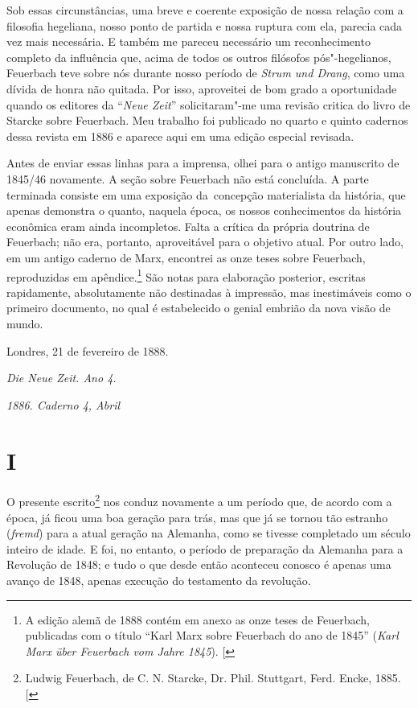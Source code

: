 Sob essas circunstâncias, uma breve e coerente exposição de nossa
relação com a filosofia hegeliana, nosso ponto de partida e nossa
ruptura com ela, parecia cada vez mais necessária. E também me pareceu
necessário um reconhecimento completo da influência que, acima de todos
os outros filósofos pós"-hegelianos, Feuerbach teve sobre nós durante
nosso período de \emph{Strum und Drang}, como uma dívida de honra não
quitada. Por isso, aproveitei de bom grado a oportunidade quando os
editores da ``\emph{Neue Zeit}'' solicitaram"-me uma revisão critica do
livro de Starcke sobre Feuerbach. Meu trabalho foi publicado no quarto e
quinto cadernos dessa revista em 1886 e aparece aqui em uma edição
especial revisada.

Antes de enviar essas linhas para a imprensa, olhei para o antigo
manuscrito de 1845/46 novamente. A seção sobre Feuerbach não está
concluída. A parte terminada consiste em uma exposição da\est\ concepção
materialista da história, que apenas demonstra o quanto, naquela época,
os nossos conhecimentos da história econômica eram ainda incompletos.
Falta a crítica da própria doutrina de Feuerbach; não era, portanto,
aproveitável para o objetivo atual. Por outro lado, em um antigo caderno
de Marx, encontrei as onze teses sobre Feuerbach, reproduzidas em
apêndice.\footnote{A edição alemã de 1888 contém em anexo as
  onze teses de Feuerbach, publicadas com o título ``Karl Marx sobre
  Feuerbach do ano de 1845'' (\emph{Karl Marx über Feuerbach vom Jahre
  1845}). {[}\versal{N.\,T.}{]}} São notas para elaboração posterior, escritas rapidamente,
absolutamente não destinadas à impressão, mas inestimáveis ​​como o
primeiro documento, no qual é estabelecido o genial embrião da nova
visão de mundo.

\bigskip

\hfill{}Londres, 21 de fevereiro de 1888.

\quebra

\hfill{}\emph{Die Neue Zeit. Ano 4.}

\hfill{}\emph{1886. Caderno 4, Abril}

\bigskip


\section{I}

O presente escrito\footnote{Ludwig Feuerbach, de C.
  N. Starcke, Dr. Phil. Stuttgart, Ferd. Encke, 1885. {[}\versal{N.\,E.}{]}}
nos conduz novamente a um período que, de acordo com a época, já ficou
uma boa geração para trás, mas que já se tornou tão estranho
(\emph{fremd}) para a atual geração na Alemanha, como se tivesse
completado um século inteiro de idade. E foi, no entanto, o período de
preparação da Alemanha para a Revolução de 1848; e tudo o que desde
então aconteceu conosco é apenas uma avanço de 1848, apenas execução do
testamento da revolução.

